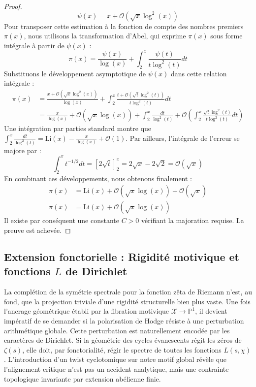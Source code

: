 \documentclass[
]{article}
\begin{document}
\begin{proof}
\begin{equation*}
\psi(x) = x + \mathcal{O}(\sqrt{x} \log^2(x))
\end{equation*}
Pour transposer cette estimation à la fonction de compte des nombres premiers $\pi(x)$, nous utilisons la transformation d'Abel, qui exprime $\pi(x)$ sous forme intégrale à partir de $\psi(x)$ :
\begin{equation*}
\pi(x) = \frac{\psi(x)}{\log(x)} + \int_2^x \frac{\psi(t)}{t \log^2(t)} dt
\end{equation*}
Substituons le développement asymptotique de $\psi(x)$ dans cette relation intégrale :
\begin{align*}
\pi(x) &= \frac{x + \mathcal{O}(\sqrt{x} \log^2(x))}{\log(x)} + \int_2^x \frac{t + \mathcal{O}(\sqrt{t} \log^2(t))}{t \log^2(t)} dt \\
&= \frac{x}{\log(x)} + \mathcal{O}(\sqrt{x} \log(x)) + \int_2^x \frac{dt}{\log^2(t)} + \mathcal{O}\left( \int_2^x \frac{\sqrt{t} \log^2(t)}{t \log^2(t)} dt \right)
\end{align*}
Une intégration par parties standard montre que $\int_2^x \frac{dt}{\log^2(t)} = \mathrm{Li}(x) - \frac{x}{\log(x)} + \mathcal{O}(1)$.
Par ailleurs, l'intégrale de l'erreur se majore par :
\begin{equation*}
\int_2^x t^{-1/2} dt = \left[ 2\sqrt{t} \right]_2^x = 2\sqrt{x} - 2\sqrt{2} = \mathcal{O}(\sqrt{x})
\end{equation*}
En combinant ces développements, nous obtenons finalement :
\begin{align*}
\pi(x) &= \mathrm{Li}(x) + \mathcal{O}(\sqrt{x} \log(x)) + \mathcal{O}(\sqrt{x}) \\
\pi(x) &= \mathrm{Li}(x) + \mathcal{O}(\sqrt{x} \log(x))
\end{align*}
Il existe par conséquent une constante $C > 0$ vérifiant la majoration requise. La preuve est achevée.
\end{proof}


\subsection{Extension fonctorielle : Rigidité motivique et fonctions $L$ de Dirichlet}

La complétion de la symétrie spectrale pour la fonction zêta de Riemann n'est, au fond, que la projection triviale d'une rigidité structurelle bien plus vaste. Une fois l'ancrage géométrique établi par la fibration motivique $\mathcal{X} \to \mathbb{P}^1$, il devient impératif de se demander si la polarisation de Hodge résiste à une perturbation arithmétique globale. Cette perturbation est naturellement encodée par les caractères de Dirichlet. Si la géométrie des cycles évanescents régit les zéros de $\zeta(s)$, elle doit, par fonctorialité, régir le spectre de toutes les fonctions $L(s, \chi)$. L'introduction d'un twist cyclotomique sur notre motif global révèle que l'alignement critique n'est pas un accident analytique, mais une contrainte topologique invariante par extension abélienne finie.
\end{document}
